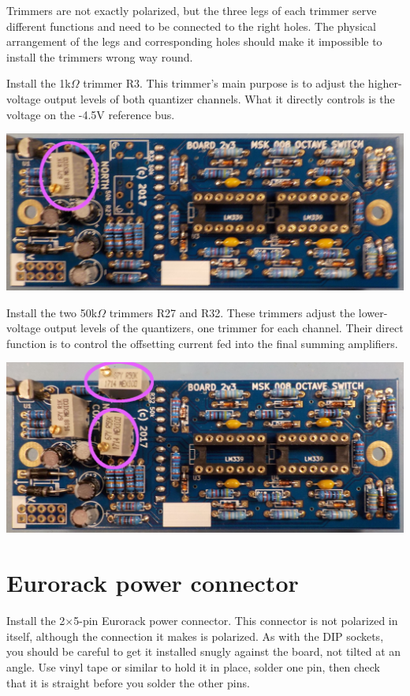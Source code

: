 Trimmers are not exactly polarized, but the three legs of each trimmer serve
different functions and need to be connected to the right holes.  The
physical arrangement of the legs and corresponding holes should make it
impossible to install the trimmers wrong way round.

Install the 1k$\Omega$ trimmer R3.  This trimmer's main purpose is to adjust
the higher-voltage output levels of both quantizer channels.  What it
directly controls is the voltage on the -4.5V reference bus.

\noindent\includegraphics[width=\linewidth]{pot-1k.jpg}

Install the two 50k$\Omega$ trimmers R27 and R32.  These trimmers adjust the
lower-voltage output levels of the quantizers, one trimmer for each channel. 
Their direct function is to control the offsetting current fed into the
final summing amplifiers.

\noindent\includegraphics[width=\linewidth]{pot-50k.jpg}

\section{Eurorack power connector}

Install the 2$\times$5-pin Eurorack power connector.  This connector is not
polarized in itself, although the connection it makes is polarized.  As with
the DIP sockets, you should be careful to get it installed snugly against
the board, not tilted at an angle.  Use vinyl tape or similar to hold it in
place, solder one pin, then check that it is straight before you solder the
other pins.

